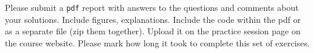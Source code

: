 \documentclass[a4paper,11pt]{article}
\begin{document}
\ \\
\ \\
\ \\
\ \\
\ \\
Please submit a \texttt{pdf} report with answers to the questions and comments about your solutions. Include figures, explanations. Include the code within the pdf or as a separate file (zip them together). Upload it on the practice session page on the course website. Please mark how long it took to complete this set of exercises.
\end{document}
